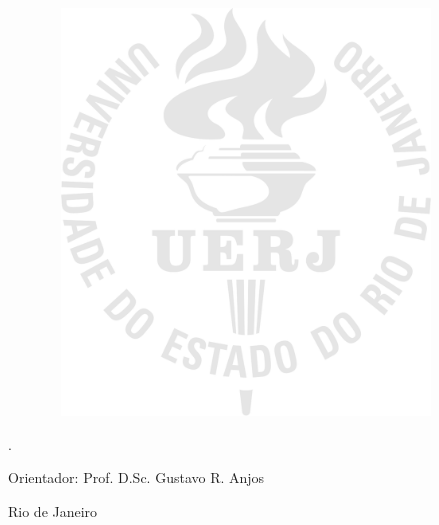 \begin{center}

\authorName

\vspace{2cm}

\textbf{\mainTitle}

\vspace{1.0cm}

\begin{figure}[hbt!]
\begin{center}
\includegraphics[width=10.48cm,height=10.8cm]{./00_Pre_textuais/logo_uerj_gnd_pb.png}
\end{center}
\end{figure}

\vspace{-9cm}
\begin{flushright}
\parbox{8cm}{
.
}
\end{flushright}

\vspace{4.0cm}

Orientador: Prof. D.Sc. Gustavo R. Anjos\\

\par\vfill

Rio de Janeiro\\ \curYear

\end{center}